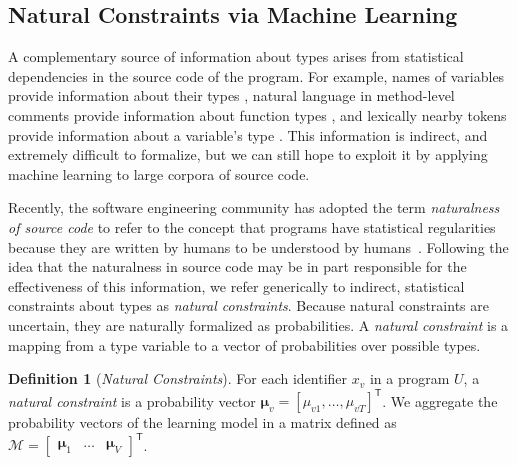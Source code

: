 \documentclass[sigplan,10pt,review,anonymous]{acmart} %
\theoremstyle{plain}
\theoremstyle{remark}
\theoremstyle{definition}
\newtheorem{defn}{Definition}[section]
\begin{document}
\subsection{Natural Constraints via Machine Learning}\label{ssec:natcon}

A complementary source of information about types arises from statistical dependencies
in the source code of the program.  For example, names of variables provide
information about their types \cite{xu16}, natural language in
method-level comments provide information about function types \cite{malik19},
and lexically nearby tokens provide information
about a variable's type \cite{hellendoorn18}.
This information is indirect, and extremely difficult to formalize,
but we can still hope to exploit it by applying machine learning
to large corpora of source code.

Recently, the software engineering
community has adopted the term \emph{naturalness of source code} to refer to
the concept that programs have statistical regularities because
they are written by humans to be
understood by humans~\citep{hindle12}.
Following the idea that the naturalness in source code may be in part responsible
for the effectiveness of this information, we
refer generically to indirect, statistical
constraints about types as \emph{natural constraints}.
Because natural constraints are uncertain, they are naturally formalized
as probabilities.
A \emph{natural constraint} is a mapping from a type variable to a vector
of probabilities
over possible types.
\begin{defn}[\emph{Natural Constraints}]\label{eq:natural}
  For each identifier $x_v$ in a program $U$,
  a \emph{natural constraint} is a probability vector $\bm{\mu}_v = [\mu_{v1}, \ldots, \mu_{vT}]^\mathsf{T}$.
  We aggregate the probability vectors of the learning model in a matrix
  defined as $\mathcal{M} = \begin{bmatrix} \bm{\mu}_1 & \ldots & \bm{\mu}_{V} \end{bmatrix}^\mathsf{T}$.
\end{defn}
\end{document}
